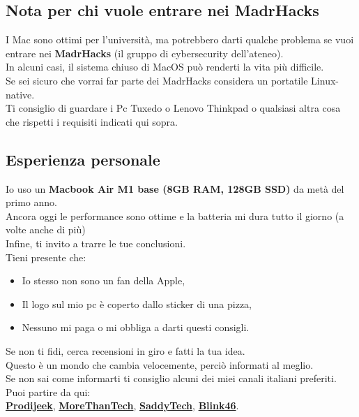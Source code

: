 \documentclass[18pt]{extarticle}
\begin{document}
\subsection{Nota per chi vuole entrare nei MadrHacks}
I Mac sono ottimi per l’università, ma potrebbero darti qualche problema se vuoi entrare nei \textbf{MadrHacks} (il gruppo di cybersecurity dell’ateneo).\\
In alcuni casi, il sistema chiuso di MacOS può renderti la vita più difficile.\\
Se sei sicuro che vorrai far parte dei MadrHacks considera un portatile Linux-native.\\
Ti consiglio di guardare i Pc Tuxedo o Lenovo Thinkpad o qualsiasi altra cosa che rispetti i requisiti indicati qui sopra.


\subsection{Esperienza personale}
Io uso un \textbf{Macbook Air M1 base (8GB RAM, 128GB SSD)} da metà del primo anno.\\
Ancora oggi le performance sono ottime e la batteria mi dura tutto il giorno (a volte anche di più)\\
Infine, ti invito a trarre le tue conclusioni.\\
Tieni presente che:
\begin{itemize}
\item Io stesso non sono un fan della Apple,
\item Il logo sul mio pc è coperto dallo sticker di una pizza,
\item Nessuno mi paga o mi obbliga a darti questi consigli.
\end{itemize}%
Se non ti fidi, cerca recensioni in giro e fatti la tua idea.\\
Questo è un mondo che cambia velocemente, perciò informati al meglio.\\
Se non sai come informarti ti consiglio alcuni dei miei canali italiani preferiti. Puoi partire da qui:\\
\href{https://www.youtube.com/@Prodigeek}{\textbf{Prodijeek}}, \href{https://www.youtube.com/@MoreThanTech}{\textbf{MoreThanTech}}, \href{https://www.youtube.com/@SaddyTech}{\textbf{SaddyTech}}, \href{https://www.youtube.com/@Blink46yt}{\textbf{Blink46}}.

\clearpage
\end{document}
